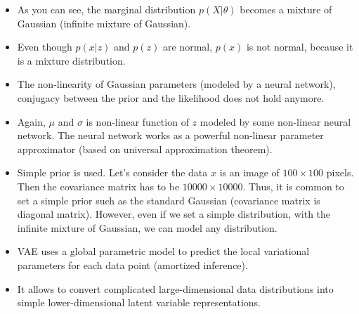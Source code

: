 \begin{itemize}
	\item As you can see, the marginal distribution $p(X|\theta)$ becomes a mixture of Gaussian (infinite mixture of Gaussian). 
	\item Even though $p(x|z)$ and $p(z)$ are normal, $p(x)$ is not normal, because it is a mixture distribution.
	\item The non-linearity of Gaussian parameters (modeled by a neural network), conjugacy between the prior and the likelihood does not hold anymore.
	\item Again, $\mu$ and $\sigma$ is non-linear function of $z$ modeled by some non-linear neural network. The neural network works as a powerful non-linear parameter approximator (based on universal approximation theorem). 
	\item Simple prior is used. Let's consider the data $x$ is an image of $100\times 100$ pixels. Then the covariance matrix has to be $10000\times 10000$. Thus, it is common to set a simple prior such as the standard Gaussian (covariance matrix is diagonal matrix). However, even if we set a simple distribution, with the infinite mixture of Gaussian, we can model any distribution.
	\item VAE uses a global parametric model to predict the local
		variational parameters for each data point (amortized inference). 
	\item It allows to convert complicated large-dimensional data distributions into simple lower-dimensional latent variable representations.  
\end{itemize}

